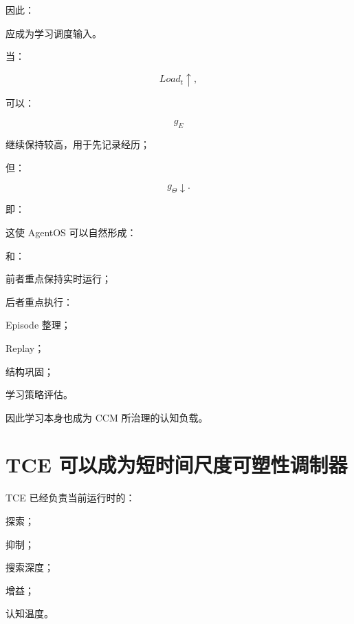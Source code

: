 因此：

\begin{statementbox}
\centering
{}
\end{statementbox}

应成为学习调度输入。

当：

\[
Load_t\uparrow,
\]

可以：

\[
g_E
\]

继续保持较高，用于先记录经历；

但：

\[
g_\Theta\downarrow.
\]

即：

\begin{statementbox}
\centering
{}
\end{statementbox}

这使 AgentOS 可以自然形成：

\begin{statementbox}
\centering
{}
\end{statementbox}

和：

\begin{statementbox}
\centering
{}
\end{statementbox}

前者重点保持实时运行；

后者重点执行：

Episode 整理；

Replay；

结构巩固；

学习策略评估。

因此学习本身也成为 CCM 所治理的认知负载。


\section{TCE 可以成为短时间尺度可塑性调制器}

TCE 已经负责当前运行时的：

探索；

抑制；

搜索深度；

增益；

认知温度。

